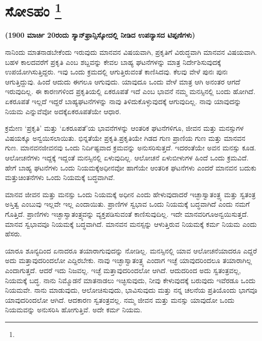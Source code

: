 
\vspace{-0.4cm}

\chapter[ಸೋಽಹಂ ]{ಸೋಽಹಂ \protect\footnote{}}

\centerline{\textbf{(1900 ಮಾರ್ಚಿ 20ರಂದು ಸ್ಯಾನ್​ಫ್ರಾನ್ಸಿಸ್ಕೋದಲ್ಲಿ ನೀಡಿದ ಉಪನ್ಯಾಸದ ಟಿಪ್ಪಣಿಗಳು)}}

\vskip 0.3cm

ನಾನಿಂದು ಮಾತನಾಡಬೇಕೆಂದು ಇರುವುದು ಮಾನವನ ವಿಷಯವಾಗಿ, ಪ್ರಕೃತಿಗೆ ವಿರುದ್ಧವಾಗಿ ಮಾನವನ ವಿಷಯವಾಗಿ. ಬಹಳ ಕಾಲದವರೆಗೆ ಪ್ರಕೃತಿ ಎಂಬ ಶಬ್ದವನ್ನು ಕೇವಲ ಬಾಹ್ಯ ಘಟನೆಗಳನ್ನು ಮಾತ್ರ ನಿರ್ದೇಶಿಸುವುದಕ್ಕೆ ಉಪಯೋಗಿಸುತ್ತಿದ್ದರು. ಇವು ಒಂದು ಕ್ರಮದಲ್ಲಿ ಆಗುತ್ತಿರುವಂತೆ ಕಾಣಿಸಿದವು. ಕೆಲವು ವೇಳೆ ಪುನಃ ಪುನಃ ಆಗುತ್ತಿದ್ದುವು. ಹಿಂದೆ ಆದುದು ಈಗಲೂ ಆಗುವುದು. ಯಾವುದೂ ಒಂದು ವೇಳೆ ಮಾತ್ರ ಆಗಿ ಅನಂತರ ಆಗದೆ ಇರುವುದಿಲ್ಲ. ಈ ಕಾರಣಗಳಿಂದ ಪ್ರಕೃತಿಯಲ್ಲಿ ಏಕರೂಪತೆ ಇದೆ ಎಂಬ ಭಾವನೆ ನಮ್ಮ ಮನಸ್ಸಿನಲ್ಲಿ ಬಂದು ಹೋಗಿದೆ. ಏಕರೂಪತೆ ಇಲ್ಲದೆ ಇದ್ದರೆ ಬಾಹ್ಯಘಟನೆಗಳನ್ನು ನಾವು ತಿಳಿದುಕೊಳ್ಳುವುದಕ್ಕೆ ಆಗುವುದಿಲ್ಲ. ನಾವು ಯಾವುದನ್ನು ನಿಯಮ ಎನ್ನುವೆವೋ ಅದಕ್ಕೆ\break ಏಕರೂಪತೆಯೇ ಆಧಾರ.

ಕ್ರಮೇಣ ‘ಪ್ರಕೃತಿ’ ಮತ್ತು ‘ಏಕರೂಪತೆ’ಯ ಭಾವನೆಗಳನ್ನು ಆಂತರಿಕ ಘಟನೆಗಳಿಗೂ, ಜೀವನ ಮತ್ತು ಮನಸ್ಸುಗಳ ವಿಷಯಕ್ಕೂ ಅನ್ವಯಿಸಲಾಯಿತು. ಭಿನ್ನತೆಯೇ ಪ್ರಕೃತಿ.\break ಪ್ರಕೃತಿಯೇ ಗಿಡದ ಗುಣ ಪ್ರಾಣಿಯ ಗುಣ ಮತ್ತು ಮಾನವನ ಗುಣ. ಮಾನವನ\break ಜೀವನವು ಒಂದು ನಿರ್ದಿಷ್ಟವಾದ ಕ್ರಮವನ್ನು ಅನುಸರಿಸುತ್ತದೆ. ಇದರಂತೆಯೇ ಅವನ ಮನಸ್ಸು ಕೂಡ. ಆಲೋಚನೆಗಳು ಇದ್ದಕ್ಕೆ ಇದ್ದಂತೆ ಮನಸ್ಸಿನಲ್ಲಿ ಏಳುವುದಿಲ್ಲ. ಆಲೋಚನೆ ಏಳುಬೀಳುಗಳ ಹಿಂದೆ ಒಂದು ಕ್ರಮವಿದೆ. ಹೇಗೆ ಬಾಹ್ಯ ಘಟನೆಗಳು ಒಂದು ನಿಯಮಕ್ಕೆ\break ಅಧೀನವೋ ಹಾಗೆಯೇ ಆಂತರಿಕ ಘಟನೆಗಳು ಎಂದರೆ ಮಾನವನ ಬದುಕು ಮತ್ತು\break ಚಿಂತನೆಗಳು ಒಂದು ನಿಯಮಕ್ಕೆ ಬದ್ಧವಾಗಿವೆ.

ಮಾನವ ಜೀವನ ಮತ್ತು ಮನಸ್ಸು ಒಂದು ನಿಯಮಕ್ಕೆ ಅಧೀನ ಎಂದು ಹೇಳುವುದಾದರೆ ಇಚ್ಛಾಸ್ವಾತಂತ್ರ್ಯ ಮತ್ತು ಸ್ವತಂತ್ರ ಅಸ್ತಿತ್ವ ಎಂಬುವು ಇಲ್ಲವೇ ಇಲ್ಲ ಎಂದಾಯಿತು. ಪ್ರಾಣಿಗಳ ಸ್ವಭಾವ ಒಂದು ನಿಯಮಕ್ಕೆ ಬದ್ಧವಾಗಿದೆ ಎಂದು ನಮಗೆ ಗೊತ್ತಿದೆ. ಪ್ರಾಣಿಗಳು ಇಚ್ಛಾಸ್ವಾತಂತ್ರ್ಯವನ್ನು ವ್ಯಕ್ತಪಡಿಸುವಂತೆ ಕಾಣಿಸುವುದಿಲ್ಲ. ಇದೇ ಮಾನವರಿಗೂ\break ಅನ್ವಯಿಸುತ್ತದೆ. ಮಾನವ ಸ್ವಭಾವವೂ ನಿಯಮಕ್ಕೆ ಬದ್ಧವಾಗಿದೆ. ಮಾನವನ ಮನಸ್ಸನ್ನು ಆಳುತ್ತಿರುವ ನಿಯಮಕ್ಕೆ ಕರ್ಮ ನಿಯಮ ಎಂದು ಹೆಸರು.

\vskip 5pt

ಯಾರೂ ಶೂನ್ಯದಿಂದ ಏನಾದರೂ ತಯಾರಾಗುವುದನ್ನು ನೋಡಿಲ್ಲ. ಮನಸ್ಸಿನಲ್ಲಿ ಯಾವ ಆಲೋಚನೆಯಾದರೂ ಎದ್ದರೆ ಅದು ಮತ್ತಾವುದರಿಂದಲೋ ಎದ್ದಿರಬೇಕು. ನಾವು ಇಚ್ಛಾಸ್ವಾತಂತ್ರ್ಯ ಎಂದಾಗ ಇಚ್ಛೆ ಯಾವುದರಿಂದಲೂ ತಯಾರಾಗಿಲ್ಲ ಎಂದಾಗುತ್ತದೆ. ಆದರೆ ಇದು ನಿಜವಲ್ಲ. ಇಚ್ಛೆ ಮತ್ತಾವುದರಿಂದಲೋ ಆಗಿದೆ. ಆದುದರಿಂದ ಅದು ಸ್ವತಂತ್ರವಲ್ಲ, ನಿಯಮಕ್ಕೆ ಬದ್ಧ. ನಾನು ನಿಮ್ಮೊಡನೆ ಮಾತನಾಡಲು ಇಚ್ಛಿಸುವುದು, ನೀವು ಕೇಳುವುದಕ್ಕೆ ಬರುವುದು ಇವೆರಡೂ ಒಂದು ನಿಯಮವೇ. ನಾನು ಮಾಡುವುದು, ಆಲೋಚಿಸುವುದು, ಭಾವಿಸುವುದು ಮತ್ತು ನನ್ನ ಚಲನೆಯ ಪ್ರತಿಯೊಂದು ಭಾಗವೂ ಯಾವುದರಿಂದಲೋ ಆಗಿದೆ. ಆದಕಾರಣ ಸ್ವತಂತ್ರವಲ್ಲ. ನಮ್ಮ ಜೀವನ ಮತ್ತು ಮನಸ್ಸು ಯಾವುದೋ ಒಂದು ನಿಯಮವನ್ನು ಅನುಸರಿಸಿ ಹೋಗುತ್ತಿವೆ. ಅದೇ ಕರ್ಮ ನಿಯಮ.

